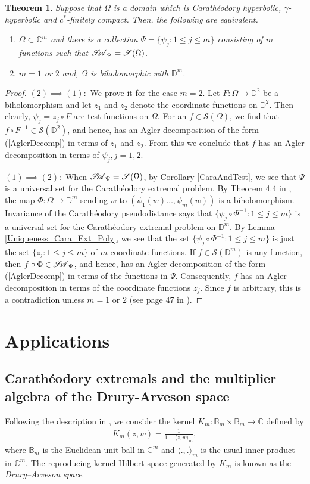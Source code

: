 \documentclass[12pt]{amsart}
\newtheorem{theorem}{Theorem}[section]
\theoremstyle{definition}
\numberwithin{equation}{section}
\newcommand{\D}{\mathbb{D}}
\newcommand{\SA}{\mathscr{S\mspace{-5mu}A}}
\begin{document}
\begin{theorem}
	Suppose that $\Omega$ is a domain which is Carath\'eodory hyperbolic, $\gamma$-hyperbolic and $c^*$-finitely compact. Then, the following are equivalent.
	\begin{enumerate}
		\item $\Omega\subset \mathbb{C}^m$ and there is a collection $\Psi=\{\psi_j:1\leq j\leq m\}$ consisting of $m$ functions such that $\SA_\Psi=\mathscr{S}(\Omega)$.
		\item $m=1$ or $2$ and, $\Omega$ is biholomorphic with $\D^m$.
	\end{enumerate}
\end{theorem}
\begin{proof}
	$(2)\implies (1):$ We prove it for the case $m=2$. Let $F:\Omega\rightarrow \D^2$ be a biholomorphism and let $z_1$ and $z_2$ denote the coordinate functions on $\D^2$. Then clearly, $\psi_j=z_j\circ F$ are test functions on $\Omega$. For an $f\in \mathscr{S}(\Omega)$, we find that $f\circ F^{-1}\in \mathscr{S}(\D^2)$, and hence, has an Agler decomposition of the form (\ref{AglerDecomp}) in terms of $z_1$ and $z_2$. From this we conclude that $f$ has an Agler decomposition in terms of $\psi_j,j=1,2$.
	
	$(1)\implies(2):$ When $\SA_\Psi=\mathscr{S}(\Omega)$, by Corollary \ref{CaraAndTest}, we see that $\Psi$ is a universal set for the Carath\'eodory extremal problem. By Theorem 4.4 in \cite{KosinZwoExt}, the map $\Phi:\Omega\rightarrow \D^m$ sending $w$ to $(\psi_1(w)\ldots,\psi_m (w))$ is a biholomorphism. Invariance of the Carath\'eodory pseudodistance says that $\{\psi_j\circ \Phi^{-1}:1\leq j\leq m\}$ is a universal set for the Carath\'eodory extremal problem on $\D^m$. By Lemma \ref{Uniqueness_Cara_Ext_Poly}, we see that the set $\{\psi_j\circ \Phi^{-1}:1\leq j\leq m\}$ is just the set $\{z_j:1\leq j\leq m\}$ of $m$ coordinate functions. If $f\in \mathscr{S}(\D^m)$ is any function, then $f\circ \Phi\in \SA_\Psi$, and hence, has an Agler decomposition of the form (\ref{AglerDecomp}) in terms of the functions in $\Psi$. Consequently, $f$ has an Agler decomposition in terms of the coordinate functions $z_j$. Since $f$ is arbitrary, this is a contradiction unless $m=1$ or $2$ (see page 47 in \cite{Agler1990}).
\end{proof}
\section{Applications}\label{Applications}
\subsection{Carath\'eodory extremals and the multiplier algebra of the Drury-Arveson space}
Following the description in \cite{A-M}, we consider the kernel $K_m:\mathbb{B}_m\times \mathbb{B}_m\rightarrow \mathbb{C}$ defined by
\begin{align*}
	K_m(z,w)=\frac{1}{1-\langle z,w\rangle_m},
\end{align*}
where $\mathbb{B}_m$ is the Euclidean unit ball in $\mathbb{C}^m$ and $\langle .,.\rangle_m$ is the usual inner product in $\mathbb{C}^m$.
The reproducing kernel Hilbert space generated by $K_m$ is known as the \textit{Drury–Arveson space}.
\end{document}
